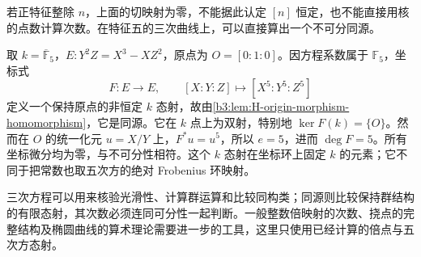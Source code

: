 
若正特征整除 \(n\)，上面的切映射为零，不能据此认定 \([n]\) 恒定，也不能直接用核的点数计算次数。在特征五的三次曲线上，可以直接算出一个不可分同源。

\begin{example}\label{b3:exm:H-inseparable-isogeny}
	取 \(k=\overline{\mathbb F}_5\)，\(E:Y^2Z=X^3-XZ^2\)，原点为 \(O=[0:1:0]\)。因方程系数属于 \(\mathbb F_5\)，坐标式
	\[
		F:E\longrightarrow E,
		\qquad [X:Y:Z]\longmapsto[X^5:Y^5:Z^5]
	\]
	定义一个保持原点的非恒定 \(k\) 态射，故由\cref{b3:lem:H-origin-morphism-homomorphism}，它是同源。它在 \(k\) 点上为双射，特别地 \(\ker F(k)=\{O\}\)。然而在 \(O\) 的统一化元 \(u=X/Y\) 上，\(F^*u=u^5\)，所以 \(e=5\)，进而 \(\deg F=5\)。所有坐标微分均为零，与不可分性相符。这个 \(k\) 态射在坐标环上固定 \(k\) 的元素；它不同于把常数也取五次方的绝对 Frobenius 环映射。
\end{example}

三次方程可以用来核验光滑性、计算群运算和比较同构类；同源则比较保持群结构的有限态射，其次数必须连同可分性一起判断。一般整数倍映射的次数、挠点的完整结构及椭圆曲线的算术理论需要进一步的工具，这里只使用已经计算的倍点与五次方态射。

